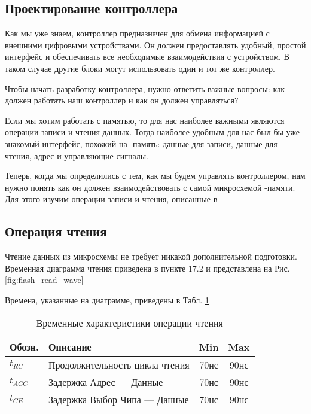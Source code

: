 \subsection{Проектирование контроллера }
\par{Как мы уже знаем, контроллер предназначен для обмена информацией с внешними цифровыми устройствами. Он должен предоставлять удобный, простой интерфейс и обеспечивать все необходимые взаимодействия с устройством. В таком случае другие блоки могут использовать один и тот же контроллер.} 
\par{Чтобы начать разработку контроллера, нужно ответить важные вопросы: как должен работать наш контроллер и как он должен управляться?}
\par{Если мы хотим работать с памятью, то для нас наиболее важными являются операции записи и чтения данных.  Тогда наиболее удобным для нас был бы уже знакомый интерфейс, похожий на -память: данные для записи, данные для чтения, адрес и управляющие сигналы.}
\par{Теперь, когда мы определились с тем, как мы будем управлять контроллером, нам нужно понять как он должен взаимодействовать с самой микросхемой -памяти. Для этого изучим операции записи и чтения, описанные в }

\subsection{Операция чтения}
\par{Чтение данных из микросхемы  не требует никакой дополнительной подготовки. Временная диаграмма чтения приведена в пункте 17.2  и представлена на Рис.\ref{fig:flash_read_wave}}

% 

\par{Времена, указанные на диаграмме, приведены в Табл. \ref{table:flash_read_timings}}

\begin{table}[htbp]
  \centering
  \small
  \begin{tabular}{l|l|c|c}
    Обозн. & Описание & Min & Max \\
    \hline
    $t_{RC}$ & Продолжительность цикла чтения & 70нс & 90нс\\
    $t_{ACC}$ & Задержка Адрес --- Данные & 70нс & 90нс\\
    $t_{CE}$ & Задержка Выбор Чипа --- Данные & 70нс & 90нс\\
  \end{tabular}
  \caption{Временные характеристики операции чтения }
  \label{table:flash_read_timings}
\end{table}

